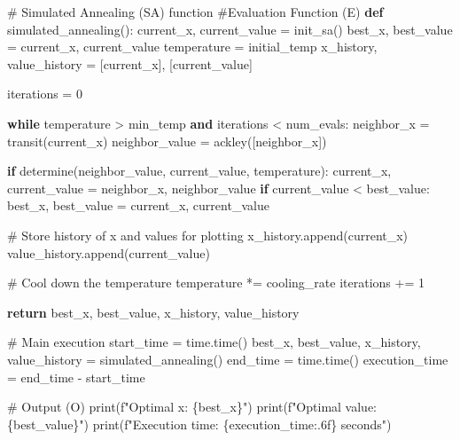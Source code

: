 \documentclass[
  letterpaper,
  DIV=11,
  numbers=noendperiod]{scrreprt}
\newenvironment{Shaded}{\begin{snugshade}}{\end{snugshade}}
\newcommand{\BuiltInTok}[1]{\textcolor[rgb]{0.00,0.23,0.31}{#1}}
\newcommand{\CommentTok}[1]{\textcolor[rgb]{0.37,0.37,0.37}{#1}}
\newcommand{\ControlFlowTok}[1]{\textcolor[rgb]{0.00,0.23,0.31}{\textbf{#1}}}
\newcommand{\DecValTok}[1]{\textcolor[rgb]{0.68,0.00,0.00}{#1}}
\newcommand{\KeywordTok}[1]{\textcolor[rgb]{0.00,0.23,0.31}{\textbf{#1}}}
\newcommand{\NormalTok}[1]{\textcolor[rgb]{0.00,0.23,0.31}{#1}}
\newcommand{\OperatorTok}[1]{\textcolor[rgb]{0.37,0.37,0.37}{#1}}
\newcommand{\SpecialCharTok}[1]{\textcolor[rgb]{0.37,0.37,0.37}{#1}}
\newcommand{\SpecialStringTok}[1]{\textcolor[rgb]{0.13,0.47,0.30}{#1}}
\begin{document}
\begin{Shaded}
\begin{Highlighting}[]
\CommentTok{\# Simulated Annealing (SA) function}
\CommentTok{\#Evaluation Function (E)}
\KeywordTok{def}\NormalTok{ simulated\_annealing():}
\NormalTok{    current\_x, current\_value }\OperatorTok{=}\NormalTok{ init\_sa()}
\NormalTok{    best\_x, best\_value }\OperatorTok{=}\NormalTok{ current\_x, current\_value}
\NormalTok{    temperature }\OperatorTok{=}\NormalTok{ initial\_temp}
\NormalTok{    x\_history, value\_history }\OperatorTok{=}\NormalTok{ [current\_x], [current\_value]}

\NormalTok{    iterations }\OperatorTok{=} \DecValTok{0}
   
    \ControlFlowTok{while}\NormalTok{ temperature }\OperatorTok{\textgreater{}}\NormalTok{ min\_temp }\KeywordTok{and}\NormalTok{ iterations }\OperatorTok{\textless{}}\NormalTok{ num\_evals:}
\NormalTok{        neighbor\_x }\OperatorTok{=}\NormalTok{ transit(current\_x)}
\NormalTok{        neighbor\_value }\OperatorTok{=}\NormalTok{ ackley([neighbor\_x])}
        
        \ControlFlowTok{if}\NormalTok{ determine(neighbor\_value, current\_value, temperature):}
\NormalTok{            current\_x, current\_value }\OperatorTok{=}\NormalTok{ neighbor\_x, neighbor\_value}
            \ControlFlowTok{if}\NormalTok{ current\_value }\OperatorTok{\textless{}}\NormalTok{ best\_value:}
\NormalTok{                best\_x, best\_value }\OperatorTok{=}\NormalTok{ current\_x, current\_value}
        
        \CommentTok{\# Store history of x and values for plotting}
\NormalTok{        x\_history.append(current\_x)}
\NormalTok{        value\_history.append(current\_value)}

        \CommentTok{\# Cool down the temperature}
\NormalTok{        temperature }\OperatorTok{*=}\NormalTok{ cooling\_rate}
\NormalTok{        iterations }\OperatorTok{+=} \DecValTok{1}

    \ControlFlowTok{return}\NormalTok{ best\_x, best\_value, x\_history, value\_history}

\CommentTok{\# Main execution}
\NormalTok{start\_time }\OperatorTok{=}\NormalTok{ time.time()}
\NormalTok{best\_x, best\_value, x\_history, value\_history }\OperatorTok{=}\NormalTok{ simulated\_annealing()}
\NormalTok{end\_time }\OperatorTok{=}\NormalTok{ time.time()}
\NormalTok{execution\_time }\OperatorTok{=}\NormalTok{ end\_time }\OperatorTok{{-}}\NormalTok{ start\_time}

\CommentTok{\# Output (O)}
\BuiltInTok{print}\NormalTok{(}\SpecialStringTok{f"Optimal x: }\SpecialCharTok{\{}\NormalTok{best\_x}\SpecialCharTok{\}}\SpecialStringTok{"}\NormalTok{)}
\BuiltInTok{print}\NormalTok{(}\SpecialStringTok{f"Optimal value: }\SpecialCharTok{\{}\NormalTok{best\_value}\SpecialCharTok{\}}\SpecialStringTok{"}\NormalTok{)}
\BuiltInTok{print}\NormalTok{(}\SpecialStringTok{f"Execution time: }\SpecialCharTok{\{}\NormalTok{execution\_time}\SpecialCharTok{:.6f\}}\SpecialStringTok{ seconds"}\NormalTok{)}


\end{Highlighting}
\end{Shaded}
\end{document}
